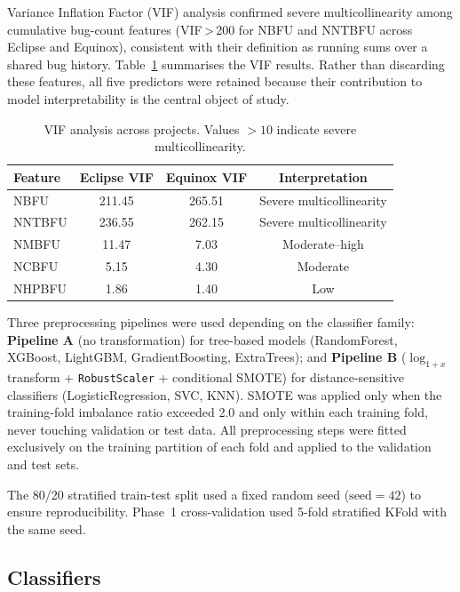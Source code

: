 \documentclass[12pt, a4paper]{article}
\newcommand{\model}[1]{\textsf{#1}}
\begin{document}
Variance Inflation Factor (VIF) analysis confirmed severe multicollinearity
among cumulative bug-count features (VIF\,>\,200 for NBFU and NNTBFU across
Eclipse and Equinox), consistent with their definition as running sums over a
shared bug history. Table~\ref{tab:vif} summarises the VIF results. Rather
than discarding these features, all five predictors were retained because
their contribution to model interpretability is the central object of study.

\begin{table}[H]
\caption{VIF analysis across projects. Values $>10$ indicate severe
multicollinearity.}
\label{tab:vif}
\centering
\small
\renewcommand{\arraystretch}{1.2}
\begin{tabular}{@{}lccc@{}}
\toprule
\textbf{Feature} & \textbf{Eclipse VIF} & \textbf{Equinox VIF}
  & \textbf{Interpretation} \\
\midrule
NBFU    & 211.45 & 265.51 & Severe multicollinearity \\
NNTBFU  & 236.55 & 262.15 & Severe multicollinearity \\
NMBFU   & 11.47  & 7.03   & Moderate–high \\
NCBFU   & 5.15   & 4.30   & Moderate \\
NHPBFU  & 1.86   & 1.40   & Low \\
\bottomrule
\end{tabular}
\end{table}

Three preprocessing pipelines were used depending on the classifier family:
\textbf{Pipeline A} (no transformation) for tree-based models
(\model{RandomForest}, \model{XGBoost}, \model{LightGBM},
\model{GradientBoosting}, \model{ExtraTrees}); and
\textbf{Pipeline B} ($\log_{1+x}$ transform + \texttt{RobustScaler} +
conditional SMOTE) for distance-sensitive classifiers
(\model{LogisticRegression}, \model{SVC}, \model{KNN}).
SMOTE was applied only when the training-fold imbalance ratio exceeded 2.0
and only within each training fold, never touching validation or test data.
All preprocessing steps were fitted exclusively on the training partition of
each fold and applied to the validation and test sets.

The 80/20 stratified train-test split used a fixed random seed ($\text{seed}=42$)
to ensure reproducibility. Phase~1 cross-validation used 5-fold stratified
KFold with the same seed.

\subsection{Classifiers}
\label{sec:classifiers}
\end{document}
